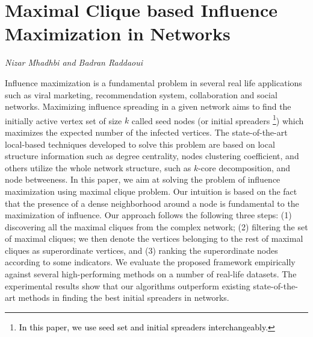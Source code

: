 \documentclass[../booklet.tex]{subfiles}
\begin{document}
\section[Maximal Clique based Influence Maximization in Networks. {\it Nizar Mhadhbi and Badran Raddaoui}]{Maximal Clique based Influence Maximization in Networks}
 

\begin{center}
  {\it Nizar Mhadhbi and Badran Raddaoui}
\end{center}

\vskip 0.8cm


Influence maximization is a fundamental problem in several real life applications such as viral marketing, recommendation system, collaboration and social networks.
Maximizing influence spreading in a given network  aims to find  the initially active vertex set of size $k$ called seed nodes (or initial spreaders \footnote{\textcolor{black}{In this paper, we use seed set and initial spreaders interchangeably.}})
which maximizes the expected number of the infected vertices.
The state-of-the-art local-based techniques developed to solve this problem are based  on  local  structure  information  such  as  degree  centrality, nodes clustering  coefficient, and  others  utilize the whole  network  structure, such  as $k$-core decomposition, and node betweeness.
In this paper, we aim at solving the problem of influence maximization using maximal clique problem.
Our intuition is based on the fact that the presence
of  a  dense  neighborhood  around  a  node  is  fundamental  to  the  maximization
of influence.
Our approach follows the following three steps: (1) discovering all the maximal cliques from the complex network; (2) filtering the set of maximal cliques; we then denote the vertices belonging to the rest of maximal cliques as superordinate vertices, and (3) ranking the superordinate nodes according to some indicators.
We evaluate the proposed framework empirically against several high-performing methods on a number of real-life datasets. The experimental results show that our algorithms outperform existing state-of-the-art
methods in finding the best initial spreaders  in networks.

\end{document}
